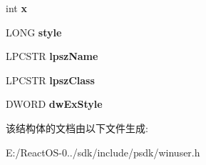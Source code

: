 \begin{DoxyCompactItemize}
int {\bfseries x}
\item 
\mbox{\label{structtag_c_r_e_a_t_e_s_t_r_u_c_t_a_ada374e009467a5f50159209057038fc1}} 
L\+O\+NG {\bfseries style}
\item 
\mbox{\label{structtag_c_r_e_a_t_e_s_t_r_u_c_t_a_a107a41559f87a55f3dfbed9a9e2c16c2}} 
L\+P\+C\+S\+TR {\bfseries lpsz\+Name}
\item 
\mbox{\label{structtag_c_r_e_a_t_e_s_t_r_u_c_t_a_aa80d23bd48fb07cfaa9621df53e74378}} 
L\+P\+C\+S\+TR {\bfseries lpsz\+Class}
\item 
\mbox{\label{structtag_c_r_e_a_t_e_s_t_r_u_c_t_a_a178a31c196ce65b92d7b04410b4d2ab3}} 
D\+W\+O\+RD {\bfseries dw\+Ex\+Style}
\end{DoxyCompactItemize}


该结构体的文档由以下文件生成\+:\begin{DoxyCompactItemize}
\item 
E\+:/\+React\+O\+S-\/0../sdk/include/psdk/winuser.\+h\end{DoxyCompactItemize}
